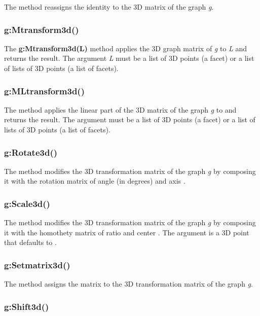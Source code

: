 The  method reassigns the identity to the 3D matrix of the graph \emph g.

\subsubsection{g:Mtransform3d()}

The \textbf{g:Mtransform3d(L)} method applies the 3D graph matrix of \emph g to \emph{L} and returns the result. The argument \emph L must be a list of 3D points (a facet) or a list of lists of 3D points (a list of facets).

\subsubsection{g:MLtransform3d()}

The  method applies the linear part of the 3D matrix of the graph \emph g to  and returns the result. The argument  must be a list of 3D points (a facet) or a list of lists of 3D points (a list of facets).

\subsubsection{g:Rotate3d()}

The method  modifies the 3D transformation matrix of the graph \emph g by composing it with the rotation matrix of angle  (in degrees) and axis .

\subsubsection{g:Scale3d()}

The method  modifies the 3D transformation matrix of the graph \emph g by composing it with the homothety matrix of ratio  and center . The argument  is a 3D point that defaults to .

\subsubsection{g:Setmatrix3d()}

The  method assigns the matrix  to the 3D transformation matrix of the graph \emph g.

\subsubsection{g:Shift3d()}

